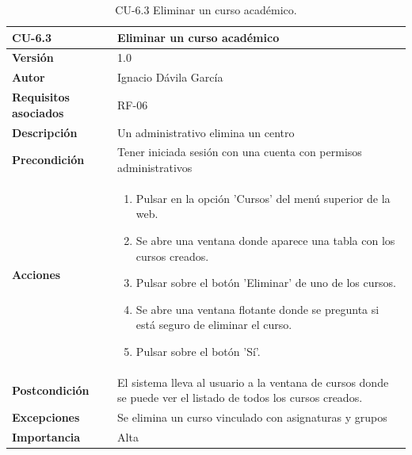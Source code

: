\begin{table}[p]
	\centering
	\begin{tabularx}{\linewidth}{ p{} p{} }
		\toprule
		\textbf{CU-6.3}    & \textbf{Eliminar un curso académico}\\
		\toprule
		\textbf{Versión}              & 1.0    \\
		\textbf{Autor}                & Ignacio Dávila García \\
		\textbf{Requisitos asociados} & RF-06 \\
		\textbf{Descripción}          & Un administrativo elimina un centro \\
		\textbf{Precondición}         & Tener iniciada sesión con una cuenta con permisos administrativos \\
		\textbf{Acciones}             &
		\begin{enumerate}
			\def\labelenumi{\arabic{enumi}.}
			\tightlist
			\item Pulsar en la opción 'Cursos' del menú superior de la web.
			\item Se abre una ventana donde aparece una tabla con los cursos creados.
			\item Pulsar sobre el botón 'Eliminar' de uno de los cursos.
			\item Se abre una ventana flotante donde se pregunta si está seguro de eliminar el curso.
			\item Pulsar sobre el botón 'Sí'.
		\end{enumerate}\\
		\textbf{Postcondición}        & El sistema lleva al usuario a la ventana de cursos donde se puede ver el listado de todos los cursos creados. \\
		\textbf{Excepciones}          & Se elimina un curso vinculado con asignaturas y grupos \\
		\textbf{Importancia}          & Alta \\
		\bottomrule
	\end{tabularx}
	\caption{CU-6.3 Eliminar un curso académico.}
\end{table}

